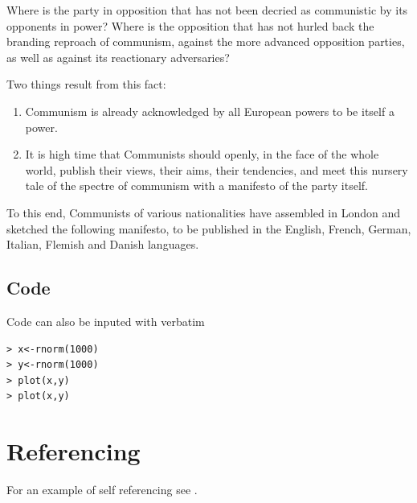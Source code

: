\documentclass[11pt]{article}
\begin{document}
Where is the party in opposition that has not been decried as communistic by its opponents in power? Where is the opposition that has not hurled back the branding reproach of communism, against the more advanced opposition parties, as well as against its reactionary adversaries?
\par 				%
Two things result from this fact:
\begin{enumerate}
	\item Communism is already acknowledged by all European powers to be itself a power.

	\item It is high time that Communists should openly, in the face of the whole world, publish their views, their aims, their tendencies, and meet this nursery tale of the spectre of communism with a manifesto of the party itself.
\end{enumerate}
To this end, Communists of various nationalities have assembled in London and sketched the following manifesto, to be published in the English, French, German, Italian, Flemish and Danish languages.

\subsection{Code}
Code can also be inputed with verbatim
\begin{verbatim}
> x<-rnorm(1000)
> y<-rnorm(1000)
> plot(x,y)
> plot(x,y)
\end{verbatim}

\section{Referencing}
For an example of self referencing see \cite{tuke2008}.


\end{document}
